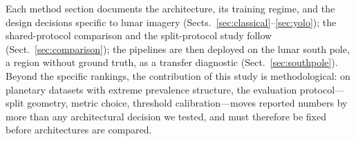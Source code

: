 Each method section documents the architecture, its training regime, and the design decisions specific to lunar imagery (Sects.~\ref{sec:classical}--\ref{sec:yolo}); the shared-protocol comparison and the split-protocol study follow (Sect.~\ref{sec:comparison}); the pipelines are then deployed on the lunar south pole, a region without ground truth, as a transfer diagnostic (Sect.~\ref{sec:southpole}). Beyond the specific rankings, the contribution of this study is methodological: on planetary datasets with extreme prevalence structure, the evaluation protocol---split geometry, metric choice, threshold calibration---moves reported numbers by more than any architectural decision we tested, and must therefore be fixed before architectures are compared.
